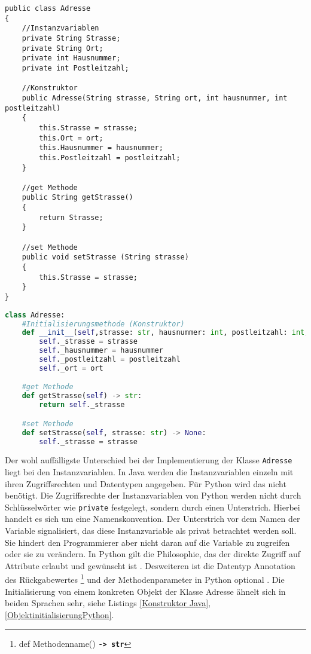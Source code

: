 \begin{lstlisting}[caption=Die Klasse Adresse in Java, label=Adressejava]
public class Adresse
{
    //Instanzvariablen
    private String Strasse;
    private String Ort;
    private int Hausnummer;
    private int Postleitzahl;

    //Konstruktor
    public Adresse(String strasse, String ort, int hausnummer, int postleitzahl)
    {
        this.Strasse = strasse;
        this.Ort = ort;
        this.Hausnummer = hausnummer;
        this.Postleitzahl = postleitzahl;
    }

    //get Methode
    public String getStrasse() 
    {
        return Strasse;
    }

    //set Methode
    public void setStrasse (String strasse)
    {
        this.Strasse = strasse;
    }
}
\end{lstlisting}

\begin{lstlisting}[caption=Die Klasse Adresse in Python, label=lst:AdressePython,language=Python]
class Adresse:
    #Initialisierungsmethode (Konstruktor)
    def __init__(self,strasse: str, hausnummer: int, postleitzahl: int, ort: str) -> None:
        self._strasse = strasse
        self._hausnummer = hausnummer
        self._postleitzahl = postleitzahl
        self._ort = ort   

    #get Methode
    def getStrasse(self) -> str:
        return self._strasse

    #set Methode
    def setStrasse(self, strasse: str) -> None:
        self._strasse = strasse

\end{lstlisting}
Der wohl auffälligste Unterschied bei der Implementierung der Klasse \texttt{Adresse} liegt bei den Instanzvariablen. In Java werden die Instanzvariablen einzeln mit ihren Zugriffsrechten und Datentypen angegeben. Für Python wird das nicht benötigt. Die Zugriffsrechte der Instanzvariablen von Python werden nicht durch Schlüsselwörter wie \texttt{private} festgelegt, sondern durch einen Unterstrich. Hierbei handelt es sich um eine Namenskonvention. Der Unterstrich vor dem Namen der Variable signalisiert, das diese Instanzvariable als privat betrachtet werden soll. Sie hindert den Programmierer aber nicht daran auf die Variable zu zugreifen oder sie zu verändern. In Python gilt die Philosophie, das der direkte Zugriff auf Attribute erlaubt und gewünscht ist \cite{PythonKalista}. Desweiteren ist die Datentyp Annotation des Rückgabewertes \footnote{def Methodenname() \textbf{\texttt{-> str}}} und der Methodenparameter in Python optional \cite{PythonBarry}. Die Initialisierung von einem konkreten Objekt der Klasse Adresse ähnelt sich in beiden Sprachen sehr, siehe Listings \ref{Konstruktor Java}, \ref{ObjektinitialisierungPython}. 

